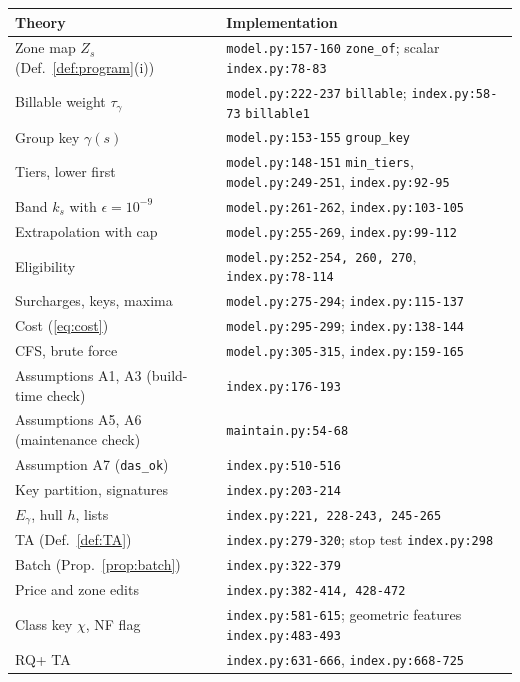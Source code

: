 \documentclass[11pt]{article}
\theoremstyle{definition}
\theoremstyle{remark}
\newcommand{\code}[1]{\texttt{#1}}
\begin{document}
\begin{longtable}{>{\raggedright\arraybackslash}p{}>{\raggedright\arraybackslash}p{}}
\toprule
Theory & Implementation \\
\midrule
\endhead
Zone map $Z_s$ (Def.~\ref{def:program}(i)) & \code{model.py:157-160} \code{zone\_of}; scalar \code{index.py:78-83} \\
Billable weight $\tau_\gamma$ & \code{model.py:222-237} \code{billable}; \code{index.py:58-73} \code{billable1} \\
Group key $\gamma(s)$ & \code{model.py:153-155} \code{group\_key} \\
Tiers, lower first & \code{model.py:148-151} \code{min\_tiers}, \code{model.py:249-251}, \code{index.py:92-95} \\
Band $k_s$ with $\epsilon=10^{-9}$ & \code{model.py:261-262}, \code{index.py:103-105} \\
Extrapolation with cap & \code{model.py:255-269}, \code{index.py:99-112} \\
Eligibility & \code{model.py:252-254, 260, 270}, \code{index.py:78-114} \\
Surcharges, keys, maxima & \code{model.py:275-294}; \code{index.py:115-137} \\
Cost (\ref{eq:cost}) & \code{model.py:295-299}; \code{index.py:138-144} \\
CFS, brute force & \code{model.py:305-315}, \code{index.py:159-165} \\
Assumptions A1, A3 (build-time check) & \code{index.py:176-193} \\
Assumptions A5, A6 (maintenance check) & \code{maintain.py:54-68} \\
Assumption A7 (\code{das\_ok}) & \code{index.py:510-516} \\
Key partition, signatures & \code{index.py:203-214} \\
$E_\gamma$, hull $h$, lists & \code{index.py:221, 228-243, 245-265} \\
TA (Def.~\ref{def:TA}) & \code{index.py:279-320}; stop test \code{index.py:298} \\
Batch (Prop.~\ref{prop:batch}) & \code{index.py:322-379} \\
Price and zone edits & \code{index.py:382-414, 428-472} \\
Class key $\chi$, NF flag & \code{index.py:581-615}; geometric features \code{index.py:483-493} \\
RQ+ TA & \code{index.py:631-666}, \code{index.py:668-725} \\

\end{longtable}
\end{document}
